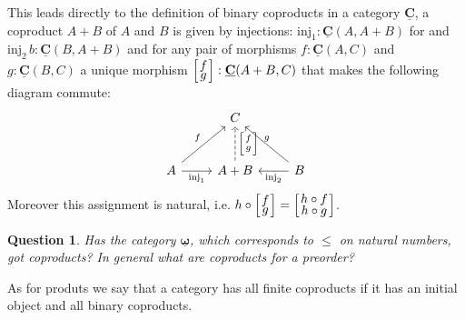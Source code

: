 \documentclass{article}
\newcommand{\cat}[1]{\underline{\mathbf{#1}}}
\newcommand{\homC}[3]{\cat{#1}(#2,#3)}
\newcommand{\inj}{\mathrm{inj}}
\newcommand{\case}[2]{{\setlength{\arraycolsep}{1pt}
   \renewcommand{\arraystretch}{0.6}\left[\begin{array}{c}#1\\#2\end{array}\right]}}
\newtheorem{question}[Exercise]{Question}
\begin{document}
This leads directly to the definition of binary coproducts in a category $\cat{C}$, a coproduct $A+B$ of $A$ and $B$ is given by injections:
$\inj_1 : \homC{C}{A}{A+B}$ for and $\inj_2\,b : \homC{C}{B}{A+B}$ and for any pair of morphisms $f : \homC{C}{A}{C}$ and 
$g : \homC{C}{B}{C}$ a unique morphism $\case{f}{g} : \homC{C}{A+B}{C}$ that makes the following diagram commute:
\[\begin{tikzcd}[row sep=large]
& C \\
A \arrow[r,"\inj_1" below] \arrow[ur,"f"] & A + B \arrow[u,dashrightarrow,"\case{f}{g}" right] & B \arrow[l,"\inj_2"] \arrow[ul,"g" above]
\end{tikzcd}\]
Moreover this assignment is natural, i.e. $h \circ \case{f}{g} = \case{h\circ f}{h\circ g}$.

\begin{question}
  Has the category $\cat{\omega}$, which corresponds to $\leq$ on natural numbers, got coproducts? In general what are coproducts for a preorder?
\end{question}

As for produts we say that a category has all finite coproducts if it has an initial object and all binary coproducts.
\end{document}
